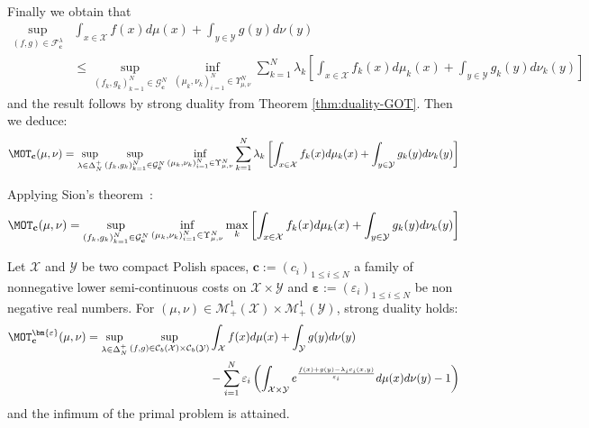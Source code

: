 \begin{prv*}
\begin{align*}
\end{align*}
Finally we obtain that 
\begin{align*}
  \sup\limits_{(f,g)\in\mathcal{F}_{\mathbf{c}}^{\lambda}}& \int_{x\in\mathcal{X}} f(x)d\mu(x)+ \int_{y\in\mathcal{Y}} g(y)d\nu(y)\\
  &\leq \sup\limits_{(f_k,g_k)_{k=1}^N\in  \mathcal{G}^{N}_{\mathbf{c}}} \inf_{(\mu_k,\nu_k)_{i=1}^N\in\Upsilon_{\mu,\nu}^N } \sum_{k=1}^N \lambda_k \left[\int_{x\in\mathcal{X}} f_k(x)d\mu_k(x)+ \int_{y\in\mathcal{Y}} g_k(y)d\nu_k(y)\right]
\end{align*}
 and the result follows by strong duality from Theorem \ref{thm:duality-GOT}. Then we deduce:
 \begin{align*}
  \MOT_{\mathbf{c}}(\mu,\nu)=\sup_{\lambda\in\Delta^+_N}
     \sup\limits_{(f_k,g_k)_{k=1}^N\in  \mathcal{G}^{N}_{\mathbf{c}}} \inf_{(\mu_k,\nu_k)_{i=1}^N\in\Upsilon_{\mu,\nu}^N } \sum_{k=1}^N \lambda_k \left[\int_{x\in\mathcal{X}} f_k(x)d\mu_k(x)+ \int_{y\in\mathcal{Y}} g_k(y)d\nu_k(y)\right]
 \end{align*}

Applying Sion's theorem~\citep{sion1958}:
 \begin{align*}
  \MOT_{\mathbf{c}}(\mu,\nu)=
     \sup\limits_{(f_k,g_k)_{k=1}^N\in  \mathcal{G}^{N}_{\mathbf{c}}} \inf_{(\mu_k,\nu_k)_{i=1}^N\in\Upsilon_{\mu,\nu}^N }\max_k \left[\int_{x\in\mathcal{X}} f_k(x)d\mu_k(x)+ \int_{y\in\mathcal{Y}} g_k(y)d\nu_k(y)\right]
 \end{align*}
\end{prv*}

\begin{prop}
\label{dual-entrop-max}
Let $\mathcal{X}$ and $\mathcal{Y}$ be two compact Polish spaces, $\mathbf{c}:=(c_i)_{1\leq i\leq N}$ a family of nonnegative lower semi-continuous costs on $\mathcal{X}\times\mathcal{Y}$ and $\bm{\varepsilon}:=(\varepsilon_i)_{1\leq i\leq N}$ be non negative real numbers. For $(\mu,\nu)\in\mathcal{M}^1_{+}(\mathcal{X})\times\mathcal{M}_+^{1}(\mathcal{Y})$, strong duality holds:
\begin{align}
    \MOT_{\mathbf{c}}^{\bm{\varepsilon}}(\mu,\nu)=\sup_{\lambda\in\Delta_N^{+}} \sup_{(f,g)\in\mathcal{C}_b(\mathcal{X})\times\mathcal{C}_b(\mathcal{Y})}& \int_{\mathcal{X}} f(x)d\mu(x)+ \int_{\mathcal{Y}} g(y)d\nu(y)\\
 &-\sum_{i=1}^N\varepsilon_i\left( \int_{\mathcal{X}\times\mathcal{Y}} e^{\frac{f(x)+g(y)-\lambda_ic_i(x,y)}{\varepsilon_i}} d\mu(x)d\nu(y)-1\right)\notag
\end{align}
and the infimum of the primal problem is attained. 
\end{prop}

